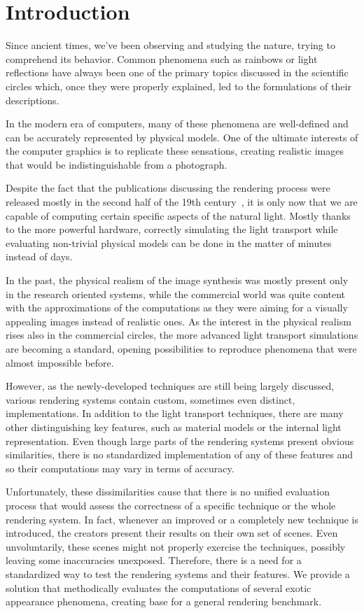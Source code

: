 \chapter*{Introduction}

Since ancient times, we've been observing and studying the nature, trying to comprehend its behavior. Common phenomena such as rainbows or light reflections have always been one of the primary topics discussed in the scientific circles which, once they were properly explained, led to the formulations of their descriptions.

In the modern era of computers, many of these phenomena are well-defined and can be accurately represented by physical models. One of the ultimate interests of the computer graphics is to replicate these sensations, creating realistic images that would be indistinguishable from a photograph.

Despite the fact that the publications discussing the rendering process were released mostly in the second half of the 19th century~\cite{kajiya1986rendering}\cite{nicodemus1965directional}, it is only now that we are capable of computing certain specific aspects of the natural light. Mostly thanks to the more powerful hardware, correctly simulating the light transport while evaluating non-trivial physical models can be done in the matter of minutes instead of days.

In the past, the physical realism of the image synthesis was mostly present only in the research oriented systems, while the commercial world was quite content with the approximations of the computations as they were aiming for a visually appealing images instead of realistic ones. As the interest in the physical realism rises also in the commercial circles, the more advanced light transport simulations are becoming a standard, opening possibilities to reproduce phenomena that were almost impossible before.

However, as the newly-developed techniques are still being largely discussed, various rendering systems contain custom, sometimes even distinct, implementations. In addition to the light transport techniques, there are many other distinguishing key features, such as material models or the internal light representation. Even though large parts of the rendering systems present obvious similarities, there is no standardized implementation of any of these features and so their computations may vary in terms of accuracy.

Unfortunately, these dissimilarities cause that there is no unified evaluation process that would assess the correctness of a specific technique or the whole rendering system. In fact, whenever an improved or a completely new technique is introduced, the creators present their results on their own set of scenes. Even unvoluntarily, these scenes might not properly exercise the techniques, possibly leaving some inaccuracies unexposed. Therefore, there is a need for a standardized way to test the rendering systems and their features. We provide a solution that methodically evaluates the computations of several exotic appearance phenomena, creating base for a general rendering benchmark.


